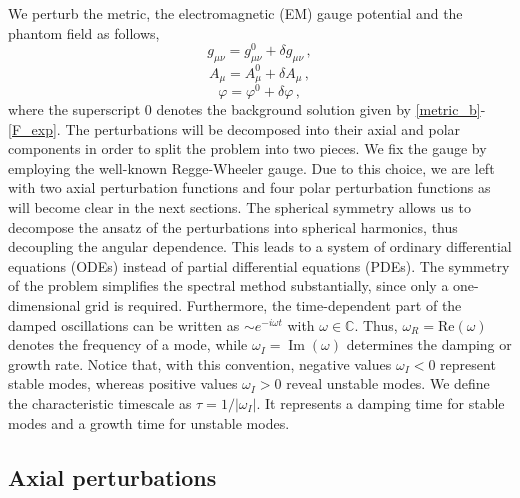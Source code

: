 \documentclass[11pt,a4paper]{article}
\begin{document}
We perturb the metric, the electromagnetic (EM) gauge potential and the phantom field as follows,
\begin{equation}
    g_{\mu\nu}=g_{\mu\nu}^0+\delta g_{\mu\nu} \, ,
\end{equation}
%
\begin{equation}
    A_{\mu}=A_{\mu}^0+\delta A_{\mu} \, ,
\end{equation}
%
\begin{equation}
    \varphi=\varphi^0+\delta\varphi \, ,
\end{equation}
where the superscript $0$ denotes the background solution given by \eqref{metric_b}-\eqref{F_exp}. 
The perturbations will be decomposed into their axial and polar components in order to split the problem into two pieces. 
We fix the gauge by employing the well-known Regge-Wheeler gauge. 
Due to this choice, we are left with two axial perturbation functions and four polar perturbation functions as will become clear in the next sections.
The spherical symmetry allows us to decompose the ansatz of the perturbations into spherical harmonics, thus decoupling the angular dependence.
This leads to a system of ordinary differential equations (ODEs) instead of partial differential equations (PDEs). 
The symmetry of the problem simplifies the spectral method substantially, since only a one-dimensional grid is required.
Furthermore, the time-dependent part of the damped oscillations can be written as $\sim e^{-i\omega t}$ with $\omega\in \mathbb{C}$. 
Thus, $\omega_R=\text{Re}(\omega)$ denotes the frequency of a mode, while $\omega_I=\operatorname{Im}(\omega)$ determines the damping or growth rate.
Notice that, with this convention, negative values $\omega_I<0$ represent stable modes, whereas positive values $\omega_I>0$ reveal unstable modes. 
We define the characteristic timescale as $\tau=1/|\omega_I|$. 
It represents a damping time for stable modes and a growth time for unstable modes.


\subsection{Axial perturbations}
\end{document}
